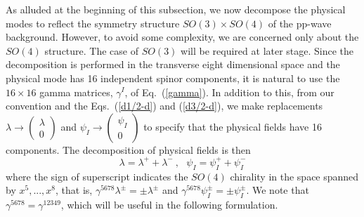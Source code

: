 \documentclass[a4paper,12pt]{article}
\numberwithin{equation}{section}
\begin{document}
As alluded at the beginning of this subsection, we now decompose the
physical modes to reflect the symmetry structure $SO(3) \times SO(4)$
of the pp-wave background.  However, to avoid some complexity, we are
concerned only about the $SO(4)$ structure.  The case of $SO(3)$ will
be required at later stage.  Since the decomposition is performed in
the transverse eight dimensional space and the physical mode has 16
independent spinor components, it is natural to use the $16 \times 16$
gamma matrices, $\gamma^I$, of Eq.~(\ref{gamma}).  In addition to
this, from our convention and the Eqs.~(\ref{d1/2-d}) and
(\ref{d3/2-d}), we make replacements $\lambda \rightarrow \left(
  \begin{array}{c} \lambda \\ 0
\end{array} \right)$ and $\psi_I \rightarrow \left( \begin{array}{c}
\psi_I \\ 0 \end{array} \right)$ to specify that the physical fields
have 16 components.  The decomposition of physical fields is then
\begin{equation}
\lambda = \lambda^+ + \lambda^- ~,~~~
\psi_I = \psi_I^+ + \psi_I^-
\end{equation}
where the sign of superscript indicates the $SO(4)$ chirality in the
space spanned by $x^5,...,x^8$, that is, $\gamma^{5678} \lambda^\pm =
\pm \lambda^\pm$ and $\gamma^{5678} \psi_I^\pm = \pm \psi_I^\pm$.  We
note that $\gamma^{5678} = \gamma^{12349}$, which will be useful in
the following formulation.
\end{document}
